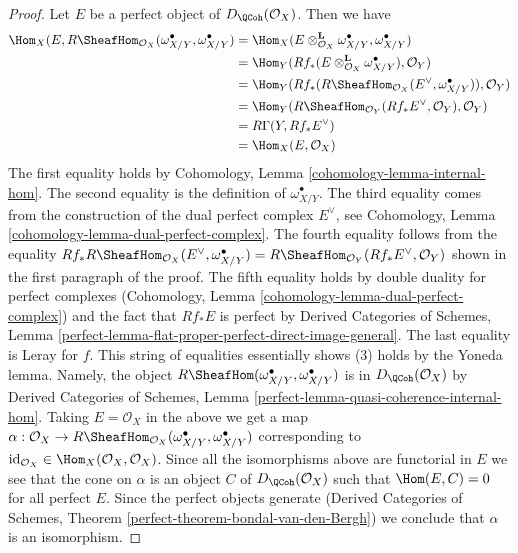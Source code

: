 \begin{proof}
\medskip\noindent
Let $E$ be a perfect object of $D_\QCoh(\mathcal{O}_X)$. Then
we have
\begin{align*}
\Hom_X(E, R\SheafHom_{\mathcal{O}_X}(\omega_{X/Y}^\bullet, \omega_{X/Y}^\bullet)
& =
\Hom_X(E \otimes_{\mathcal{O}_X}^\mathbf{L} \omega_{X/Y}^\bullet,
\omega_{X/Y}^\bullet) \\
& =
\Hom_Y(Rf_*(E \otimes_{\mathcal{O}_X}^\mathbf{L} \omega_{X/Y}^\bullet),
\mathcal{O}_Y) \\
& =
\Hom_Y(Rf_*(R\SheafHom_{\mathcal{O}_X}(E^\vee, \omega_{X/Y}^\bullet)),
\mathcal{O}_Y) \\
& =
\Hom_Y(R\SheafHom_{\mathcal{O}_Y}(Rf_*E^\vee, \mathcal{O}_Y),
\mathcal{O}_Y) \\
& =
R\Gamma(Y, Rf_*E^\vee) \\
& =
\Hom_X(E, \mathcal{O}_X)
\end{align*}
The first equality holds by Cohomology, Lemma
\ref{cohomology-lemma-internal-hom}.
The second equality is the definition of $\omega_{X/Y}^\bullet$.
The third equality comes from the construction of the dual perfect
complex $E^\vee$, see Cohomology, Lemma
\ref{cohomology-lemma-dual-perfect-complex}.
The fourth equality follows from the equality
$Rf_*R\SheafHom_{\mathcal{O}_X}(E^\vee, \omega_{X/Y}^\bullet) =
R\SheafHom_{\mathcal{O}_Y}(Rf_*E^\vee, \mathcal{O}_Y)$
shown in the first paragraph of the proof.
The fifth equality holds by double duality for perfect complexes
(Cohomology, Lemma
\ref{cohomology-lemma-dual-perfect-complex})
and the fact that $Rf_*E$ is perfect by
Derived Categories of Schemes, Lemma
\ref{perfect-lemma-flat-proper-perfect-direct-image-general}.
The last equality is Leray for $f$.
This string of equalities essentially shows (3)
holds by the Yoneda lemma. Namely, the object
$R\SheafHom(\omega_{X/Y}^\bullet, \omega_{X/Y}^\bullet)$
is in $D_\QCoh(\mathcal{O}_X)$ by Derived Categories of Schemes, Lemma
\ref{perfect-lemma-quasi-coherence-internal-hom}.
Taking $E = \mathcal{O}_X$ in the above we get a map
$\alpha : \mathcal{O}_X \to
R\SheafHom_{\mathcal{O}_X}(\omega_{X/Y}^\bullet, \omega_{X/Y}^\bullet)$
corresponding to
$\text{id}_{\mathcal{O}_X} \in \Hom_X(\mathcal{O}_X, \mathcal{O}_X)$.
Since all the isomorphisms above are functorial in $E$ we
see that the cone on $\alpha$ is an object $C$ of $D_\QCoh(\mathcal{O}_X)$
such that $\Hom(E, C) = 0$ for all perfect $E$.
Since the perfect objects generate
(Derived Categories of Schemes, Theorem
\ref{perfect-theorem-bondal-van-den-Bergh})
we conclude that $\alpha$ is an isomorphism.
\end{proof}

